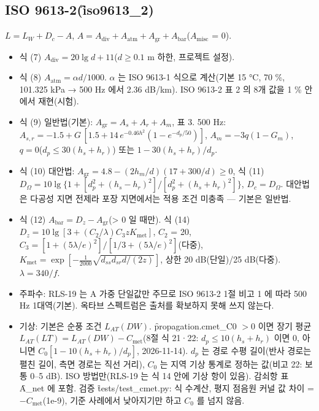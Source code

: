 \documentclass[10.5pt,a4paper]{article}
\begin{document}
\subsection{ISO 9613-2(\f{iso9613\_2})}
$L = L_W + D_c - A$, $A = A_\mathrm{div} + A_\mathrm{atm} + A_\mathrm{gr} + A_\mathrm{bar}$($A_\mathrm{misc}$ = 0).
\begin{itemize}
\item 식 (7) $A_\mathrm{div} = 20\lg d + 11$($d \ge 0.1$ m 하한, 프로젝트 설정).
\item 식 (8) $A_\mathrm{atm} = \alpha d/1000$. $\alpha$ 는 ISO 9613-1 식으로 계산(기본 15 °C, 70 \%, 101.325 kPa → 500 Hz 에서 2.36 dB/km). ISO 9613-2 표 2 의 8개 값을 1 \% 안에서 재현(시험).
\item 식 (9) 일반법(기본): $A_\mathrm{gr} = A_s + A_r + A_m$, 표 3. 500 Hz: $A_{s,r} = -1.5 + G\,[1.5 + 14\,e^{-0.46h^2}(1-e^{-d_p/50})]$, $A_m = -3q(1-G_m)$, $q = 0$($d_p \le 30(h_s+h_r)$) 또는 $1 - 30(h_s+h_r)/d_p$.
\item 식 (10) 대안법: $A_\mathrm{gr} = 4.8 - (2h_m/d)(17 + 300/d) \ge 0$, 식 (11) $D_\Omega = 10\lg\{1 + [d_p^2 + (h_s-h_r)^2]/[d_p^2 + (h_s+h_r)^2]\}$, $D_c = D_\Omega$. 대안법은 다공성 지면 전제라 포장 지면에서는 적용 조건 미충족 — 기본은 일반법.
\item 식 (12) $A_\mathrm{bar} = D_z - A_\mathrm{gr}$(> 0 일 때만). 식 (14) $D_z = 10\lg[3 + (C_2/\lambda)C_3 z K_\mathrm{met}]$, $C_2$ = 20, $C_3 = [1 + (5\lambda/e)^2]/[1/3 + (5\lambda/e)^2]$(다중), $K_\mathrm{met} = \exp[-\frac{1}{2000}\sqrt{d_{ss}d_{sr}d/(2z)}]$, 상한 20 dB(단일)/25 dB(다중). $\lambda = 340/f$.
\item 주파수: RLS-19 는 A 가중 단일값만 주므로 ISO 9613-2 1절 비고 1 에 따라 500 Hz 1대역(기본). 옥타브 스펙트럼은 출처를 확보하지 못해 쓰지 않는다.
\item 기상: 기본은 순풍 조건 $L_{AT}(DW)$. \f{propagation.cmet\_C0} $> 0$ 이면 장기 평균 $L_{AT}(LT) = L_{AT}(DW) - C_\mathrm{met}$(8절 식 21·22: $d_p \le 10(h_s + h_r)$ 이면 0, 아니면 $C_0[1 - 10(h_s + h_r)/d_p]$, 2026-11-14). $d_p$ 는 경로 수평 길이(반사 경로는 펼친 길이, 측면 경로는 직선 거리), $C_0$ 는 지역 기상 통계로 정하는 값(비고 22: 보통 0–5 dB). ISO 방법만(RLS-19 는 식 14 안에 기상 항이 있음). 감쇠항 표 \f{A\_net} 에 포함. 검증 \f{tests/test\_cmet.py}: 식 수계산, 평지 점음원 커널 값 차이 = $-C_\mathrm{met}$(1e-9), 기준 사례에서 낮아지기만 하고 $C_0$ 를 넘지 않음.
\end{itemize}
\end{document}
